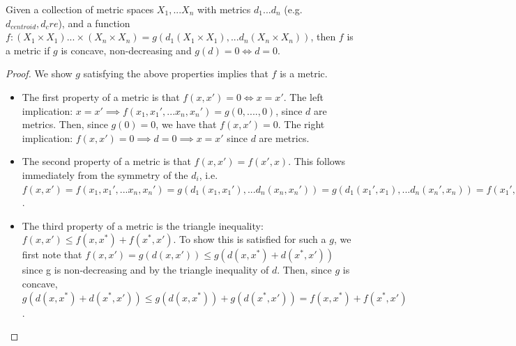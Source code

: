 \begin{proposition}
Given a collection of metric spaces $X_1, ... X_n$ with metrics $d_1 ... d_n$ (e.g. $d_{centroid}, d_cre$), and a function $f: (X_1 \times X_1) ... \times (X_n  \times X_n) = g(d_1(X_1 \times X_1),... d_n(X_n \times X_n))$, then $f$ is a metric if $g$ is concave, non-decreasing and $g(d) = 0 \Longleftrightarrow d = 0$.
\end{proposition}

\begin{proof}
We show $g$ satisfying the above properties implies that $f$ is a metric.
\begin{itemize}
    \item The first property of a metric is that $f(x,x') = 0 \Longleftrightarrow x = x'$.  The left implication: $x = x' \implies f(x_1, x_1', ... x_n, x_n') = g(0,....,0)$, since $d$ are metrics.  Then, since $g(0) = 0$, we have that $f(x,x') = 0$. The right implication: $f(x,x') = 0 \implies  d = 0 \implies x = x'$ since $d$ are metrics.
    \item The second property of a metric is that $f(x,x') = f(x',x)$. This follows immediately from the symmetry of the $d_i$, i.e. $f(x,x') = f(x_1, x_1', ... x_n, x_n') = g(d_1(x_1, x_1'), ... d_n(x_n, x_n')) = g(d_1(x_1', x_1), ... d_n(x_n', x_n)) =  f(x_1', x_1, ... x_n', x_n) = f(x',x)$.
    \item The third property of a metric is the triangle inequality: $f(x, x') \leq f(x, x^*) +  f(x^*, x') $.  To show this is satisfied for such a $g$, we first note that $f(x,x') = g(d(x,x')) \leq g(d(x, x^*) + d(x^*, x')) $ since g is non-decreasing and by the triangle inequality of $d$. Then, since $g$ is concave, $g(d(x, x^*) + d(x^*, x')) \leq g(d(x, x^*)) + g(d(x^*, x')) = f(x,x^*) + f(x^*, x')$.

\end{itemize}


\end{proof}
